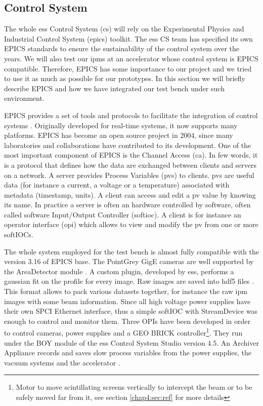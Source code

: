 \begin{refsection}
  

  \subsection{Control System}
  The whole \acrshort{ess} Control System (\acrshort{cs}) will rely on the Experimental Physics and Industrial Control System (\acrshort{epics}) toolkit. The \acrshort{ess} CS team has specified its own EPICS standards to ensure the sustainability of the control system over the years. We will also test our \acrshort{ipm}s at an accelerator whose control system is EPICS compatible. Therefore, EPICS has some importance to our project and we tried to use it as much as possible for our prototypes. In this section we will briefly describe EPICS and how we have integrated our test bench under such environment.

  EPICS provides a set of tools and protocols to facilitate the integration of control systems \cite{epics2019}. Originally developed for real-time systems, it now supports many platforms. EPICS has become an open source project in 2004, since many laboratories and collaborations have contributed to its development.
  One of the most important component of EPICS is the Channel Access (\acrshort{ca}). In few words, it is a protocol that defines how the data are exchanged between clients and servers on a network. A server provides Process Variables (\acrshort{pv}s) to clients. \acrshort{pv}s are useful data (for instance a current, a voltage or a temperature) associated with metadata (timestamp, units). A client can access and edit a \acrshort{pv} value by knowing its name. In practice a server is often an hardware controlled by software, often called software Input/Output Controller (\acrshort{softioc}). A client is for instance an operator interface (\acrshort{opi}) which allows to view and modify the \acrshort{pv} from one or more softIOCs.

  The whole system employed for the test bench is almost fully compatible with the version 3.16 of EPICS base. The PointGrey GigE cameras are well supported by the AreaDetector module \cite{ad2019}. A custom plugin, developed by \acrshort{ess}, performs a gaussian fit on the profile for every image. Raw images are saved into \acrshort{hdf}5 files \cite{hdf5}. This format allows to pack various datasets together, for instance the raw \acrshort{ipm} images with some beam information.
  Since all high voltage power supplies have their own SPCI Ethernet interface, thus a simple softIOC with StreamDevice\cite{streamdevice2019} was enough to control and monitor them.
  Three OPIs have been developed in order to control cameras, power supplies and a GEO BRICK controller\footnote{Motor to move scintillating screens vertically to intercept the beam or to be safely moved far from it, see section \ref{chap4:sec:ref} for more details}. They run under the BOY module of the \acrshort{ess} Control System Studio version 4.5. An Archiver Appliance records and saves slow process variables from the power supplies, the vacuum systems and the accelerator \cite{archiver2019}.


\end{refsection}
